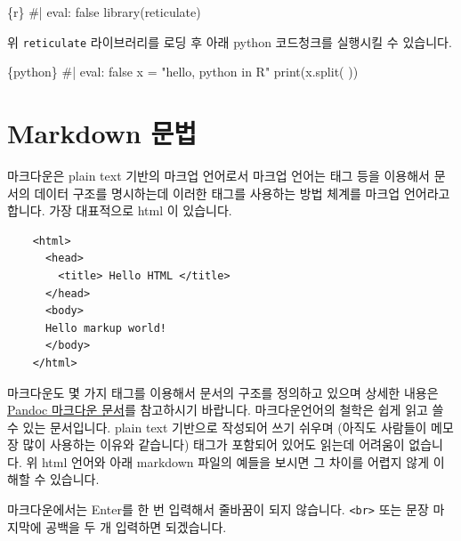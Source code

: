\documentclass[
  a4paper,
]{book}
\newenvironment{Shaded}{\begin{snugshade}}{\end{snugshade}}
\newcommand{\BuiltInTok}[1]{\textcolor[rgb]{0.00,0.23,0.31}{#1}}
\newcommand{\CommentTok}[1]{\textcolor[rgb]{0.37,0.37,0.37}{#1}}
\newcommand{\FunctionTok}[1]{\textcolor[rgb]{0.28,0.35,0.67}{#1}}
\newcommand{\InformationTok}[1]{\textcolor[rgb]{0.37,0.37,0.37}{#1}}
\newcommand{\NormalTok}[1]{\textcolor[rgb]{0.00,0.23,0.31}{#1}}
\newcommand{\OperatorTok}[1]{\textcolor[rgb]{0.37,0.37,0.37}{#1}}
\newcommand{\StringTok}[1]{\textcolor[rgb]{0.13,0.47,0.30}{#1}}
\begin{document}
\begin{Shaded}
\begin{Highlighting}[]
\InformationTok{\textasciigrave{}\textasciigrave{}\textasciigrave{}\{r\}}
\CommentTok{\#| eval: false}
\FunctionTok{library}\NormalTok{(reticulate)}
\InformationTok{\textasciigrave{}\textasciigrave{}\textasciigrave{}}
\end{Highlighting}
\end{Shaded}

위 \texttt{reticulate} 라이브러리를 로딩 후 아래 python 코드청크를
실행시킬 수 있습니다.

\begin{Shaded}
\begin{Highlighting}[]
\InformationTok{\textasciigrave{}\textasciigrave{}\textasciigrave{}\{python\}}
\CommentTok{\#| eval: false}
\NormalTok{x }\OperatorTok{=} \StringTok{"hello, python in R"}
\BuiltInTok{print}\NormalTok{(x.split(}\StringTok{\textquotesingle{} \textquotesingle{}}\NormalTok{))}
\InformationTok{\textasciigrave{}\textasciigrave{}\textasciigrave{}}
\end{Highlighting}
\end{Shaded}

\hypertarget{markdown-uxbb38uxbc95}{%
\section{Markdown 문법}\label{markdown-uxbb38uxbc95}}

마크다운은 plain text 기반의 마크업 언어로서 마크업 언어는 태그 등을
이용해서 문서의 데이터 구조를 명시하는데 이러한 태그를 사용하는 방법
체계를 마크업 언어라고 합니다. 가장 대표적으로 html 이 있습니다.

\begin{verbatim}
    <html>
      <head>
        <title> Hello HTML </title>
      </head>
      <body>
      Hello markup world!
      </body>
    </html>
\end{verbatim}

마크다운도 몇 가지 태그를 이용해서 문서의 구조를 정의하고 있으며 상세한
내용은
\href{https://rmarkdown.rstudio.com/authoring_pandoc_markdown.html}{Pandoc
마크다운 문서}를 참고하시기 바랍니다. 마크다운언어의 철학은 쉽게 읽고 쓸
수 있는 문서입니다. plain text 기반으로 작성되어 쓰기 쉬우며 (아직도
사람들이 메모장 많이 사용하는 이유와 같습니다) 태그가 포함되어 있어도
읽는데 어려움이 없습니다. 위 html 언어와 아래 markdown 파일의 예들을
보시면 그 차이를 어렵지 않게 이해할 수 있습니다.

마크다운에서는 Enter를 한 번 입력해서 줄바꿈이 되지 않습니다.
\texttt{\textless{}br\textgreater{}} 또는 문장 마지막에 공백을 두 개
입력하면 되겠습니다.
\end{document}
